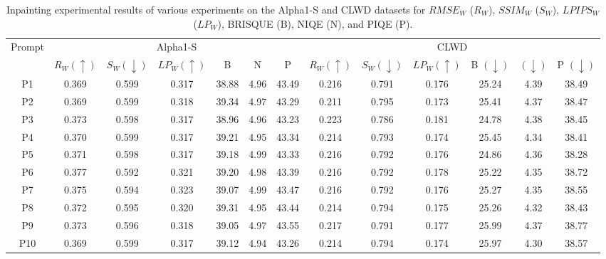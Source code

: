 
\begin{table*}[h]
\caption{Inpainting experimental results of various experiments on the Alpha1-S and CLWD datasets for $RMSE_W$ ($R_W$), $SSIM_W$ ($S_W$), $LPIPS_W$ ($LP_W$), BRISQUE (B), NIQE (N), and PIQE (P).  }
\label{tab:prompt_results_full}
\vskip 0.1in
\begin{center}
\begin{small}
\begin{sc}
\begin{tabular}{c|cccccc|cccccc}
\toprule
 \multirow{2}{*}{Prompt} &  \multicolumn{6}{c|}{Alpha1-S} & \multicolumn{6}{c}{CLWD} \\ 
  & $R_W (\uparrow)$ & $S_W (\downarrow)$ & $LP_W (\uparrow)$ & B & N & P & $R_W (\uparrow)$ & $S_W (\downarrow)$ & $LP_W (\uparrow)$ & B $(\downarrow)$ & $(\downarrow)$ & P  $(\downarrow)$\\
 \midrule
P1 & 0.369 & 0.599 & 0.317 &  38.88 & 4.96 & 43.49 & 0.216 & 0.791 & 0.176 &  25.24 & 4.39 & 38.49 \\
 P2 & 0.369 & 0.599 & 0.318 &  39.34 & 4.97 & 43.29 & 0.211 & 0.795 & 0.173 &  25.41 & 4.37 & 38.47 \\
 P3 & 0.373 & 0.598 & 0.317 &  38.96 & 4.96 & 43.23 & 0.223 & 0.786 & 0.181 &  24.78 & 4.38 & 38.45 \\
 P4 & 0.370 & 0.599 & 0.317 &  39.21 & 4.95 & 43.34 & 0.214 & 0.793 & 0.174 &  25.45 & 4.34 & 38.41 \\
 P5 & 0.371 & 0.598 & 0.317 &  39.18 & 4.99 & 43.33 & 0.216 & 0.792 & 0.176 &  24.86 & 4.36 & 38.28 \\
 P6 & 0.377 & 0.592 & 0.321 &  39.20 & 4.98 & 43.39 & 0.216 & 0.792 & 0.178 &  25.22 & 4.35 & 38.72 \\
 P7 & 0.375 & 0.594 & 0.323 &  39.07 & 4.99 & 43.47 & 0.216 & 0.792 & 0.176 &  25.27 & 4.35 & 38.55 \\
 P8 & 0.372 & 0.595 & 0.320 &  39.31 & 4.95 & 43.44 & 0.214 & 0.794 & 0.175 &  25.26 & 4.32 & 38.43 \\
 P9 & 0.373 & 0.596 & 0.318 &  39.05 & 4.97 & 43.55 & 0.217 & 0.791 & 0.177 &  25.99 & 4.37 & 38.77 \\
 P10 & 0.369 & 0.599 & 0.317 &  39.12 & 4.94 & 43.26 & 0.214 & 0.794 & 0.174 &  25.97 & 4.30 & 38.57 \\
 
\bottomrule
\end{tabular}
\end{sc}
\end{small}
\end{center}
\vskip -0.1in
\end{table*} 
